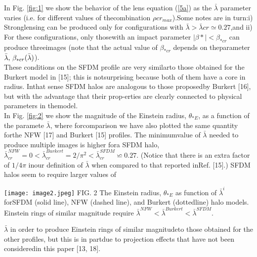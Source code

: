\documentclass[10pt,a4paper]{article}
\begin{document}
\begin{multicols}{2}
\indent
In Fig. \ref{fig:1} we show the behavior of the lens equation (\ref{5a}) as the \(\bar{\lambda}\) parameter varies (i.e.  for different values of thecombination $\rho c r_{max}$).Some notes are in turn:i) Stronglensing can be produced only for configurations with $\bar{\lambda} > \bar{\lambda}{cr}\simeq 0.27$,and ii) For these configurations, only thosewith an impact parameter $|\beta{*}|<\beta_{*cr}$ can produce threeimages (note that the actual value of $\beta_{*cr}$ depends on theparameter $\bar{\lambda}\), \(\beta_{*cr}(\bar{\lambda})$).\\
\indent
These conditions on the SFDM profile are very similarto those obtained for the Burkert model in [15]; this is notsurprising because both of them have a core in radius.  Inthat sense SFDM halos are analogous to those proposedby Burkert [16], but with the advantage that their prop-erties are clearly connected to physical parameters in themodel.\\
\indent
In  Fig.  \ref{fig:2}  we  show  the  magnitude  of  the  Einstein  radius, \(\theta_{*E}\),  as  a  function  of  the  paramete $\bar{\lambda}$,  where  forcomparison we have also plotted the same quantity forthe NFW [17] and Burkert [15] profiles.  The minimumvalue of $\bar{\lambda}$ needed to produce multiple images is higher fora SFDM halo,$\bar{\lambda}^{NFW}_{cr} = 0 < \bar{\lambda}^{Burkert}_{cr} = 2/ \pi^{2} < \bar{\lambda}^{SFDM}_{cr} \backsimeq 0.27$.  (Notice  that  there  is  an  extra  factor  of $1/4 \pi$ inour  definition  of $\bar{\lambda}$ when  compared  to  that  reported  inRef. [15].)  SFDM halos seem to require larger values of
\graphicspath{ {images/} } 
 \texttt{[image: image2.jpeg]} 
 \label{fig:2}
 FIG. 2 The  Einstein  radius, \(\theta_{*E}\)  as  function  of \(\bar{\lambda}^{i}\) forSFDM (solid line), NFW (dashed line), and Burkert (dottedline) halo models.  Einstein rings of similar magnitude require \(\bar{\lambda}^{NFW}<\bar{\lambda}^{Burkert}<\bar{\lambda}^{SFDM}\). 
 
\(\bar{\lambda}\) in order to produce Einstein rings of similar magnitudeto those obtained for the other profiles, but this is in partdue to projection effects that have not been consideredin this paper [13, 18].

\end{multicols}
\end{document}

